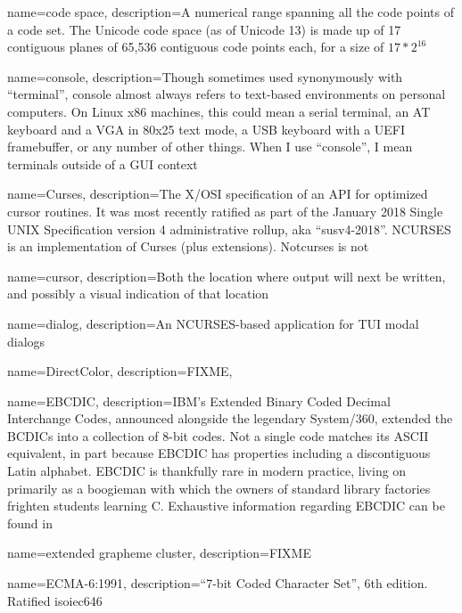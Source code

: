 {
  name={code space},
description={A numerical range spanning all the code points of a code set.
  The Unicode code space (as of Unicode 13) is made up of 17 contiguous
  planes of 65,536 contiguous code points each, for a size of $17*2^{16}$}
}

{
  name={console},
description={Though sometimes used synonymously with ``terminal'', console almost
  always refers to text-based environments on personal computers. On Linux
  x86 machines, this could mean a serial terminal, an AT keyboard and a VGA
  in 80x25 text mode, a USB keyboard with a UEFI framebuffer, or any number
  of other things. When I use ``console'', I mean terminals outside of a GUI
  context}
}

{
  name={Curses},
description={The X/OSI specification of an API for optimized cursor routines. It
  was most recently ratified as part of the January 2018 Single UNIX
  Specification version 4 administrative rollup, aka ``susv4-2018''. NCURSES is
  an implementation of Curses (plus extensions). Notcurses is not}
}

{
  name={cursor},
description={Both the location where output will next be written, and possibly
  a visual indication of that location}
}

{
  name={dialog},
description={An NCURSES-based application for TUI modal dialogs}
}

{
  name={DirectColor},
  description={FIXME},
}

{
  name={EBCDIC},
  description={IBM's Extended Binary Coded Decimal Interchange Codes, announced
    alongside the legendary System/360, extended the BCDICs into a collection
    of 8-bit codes. Not a single code matches its ASCII equivalent, in part
    because EBCDIC has properties including a discontiguous Latin alphabet.
    EBCDIC is thankfully rare in modern practice, living on primarily as
    a boogieman with which the owners of standard library factories frighten
    students learning C. Exhaustive information regarding EBCDIC can be found
    in \cite{codedcharactersets}}
}

{
  name={extended grapheme cluster},
description={FIXME }
}

{
  name={ECMA-6:1991},
  description={``7-bit Coded Character Set'', 6th edition. Ratified
    \Gls{isoiec646}}
}

